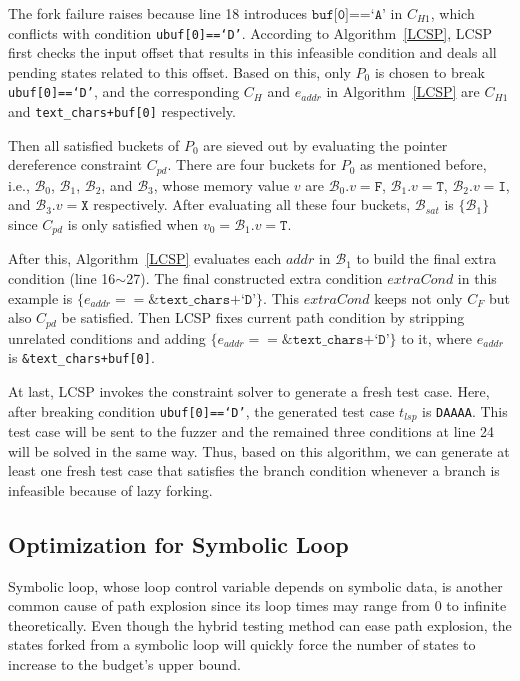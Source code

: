 \documentclass{cta-author}
\begin{document}
The fork failure raises because line 18 introduces $\texttt{buf[0]==`A'}$ in $C_{H1}$, which conflicts with condition \texttt{ubuf[0]==`D'}. 
According to Algorithm~\ref{LCSP}, 
LCSP first checks the input offset that results in this infeasible
condition and deals all pending states related to this offset. 
Based on this,
only $P_0$ is chosen to break \texttt{ubuf[0]==`D'}, and the
corresponding $C_H$ and $e_{addr}$ in Algorithm~\ref{LCSP} are $C_{H1}$ and 
\texttt{text\_chars+buf[0]} respectively.

Then all satisfied buckets of $P_0$ are sieved out by evaluating the 
pointer dereference constraint $C_{pd}$. 
There are four buckets for $P_0$ as mentioned before, i.e., $\mathcal{B}_0$, $\mathcal{B}_1$, $\mathcal{B}_2$, and $\mathcal{B}_3$, whose memory value
$v$ are $\mathcal{B}_0.v=\texttt{F}$, $\mathcal{B}_1.v=\texttt{T}$, $\mathcal{B}_2.v=\texttt{I}$, and $\mathcal{B}_3.v=\texttt{X}$ respectively. 
After evaluating all these four buckets, $\mathcal{B}_{sat}$ is $\{\mathcal{B}_1\}$ since
$C_{pd}$ is only satisfied when $v_0 = \mathcal{B}_1.v=\texttt{T}$.

After this, Algorithm~\ref{LCSP} evaluates each $addr$ in $\mathcal{B}_1$ to build the final extra condition (line 16$\sim$27). The final constructed extra
condition $extraCond$ in this example is $\{e_{addr}==\texttt{\&text\_chars+`D'}\}$.
This $extraCond$ keeps not only $C_F$ but also $C_{pd}$ be satisfied.
Then LCSP fixes current path condition by stripping unrelated conditions and adding
$\{e_{addr}==\texttt{\&text\_chars+`D'}\}$ to it, where $e_{addr}$ is \texttt{\&text\_chars+buf[0]}.

At last, LCSP invokes the constraint solver to 
generate a fresh test case. Here, after breaking condition \texttt{ubuf[0]==`D'}, the 
generated test case $t_{lsp}$ is \texttt{DAAAA}. This test case will be sent to the fuzzer and the
remained three conditions at line 24 will be solved in the same way. Thus, based on this algorithm, we can generate at least one fresh test case 
that satisfies the branch condition whenever a branch is infeasible 
because of lazy forking. 

\subsection{Optimization for Symbolic Loop}
Symbolic loop, whose loop control variable depends on symbolic data, 
is another common cause of path explosion since its loop times may 
range from 0 to infinite theoretically. 
Even though the hybrid testing method can ease path explosion, the 
states forked from a symbolic loop will quickly force the number of 
states to increase to the budget's upper bound. 
\end{document}

